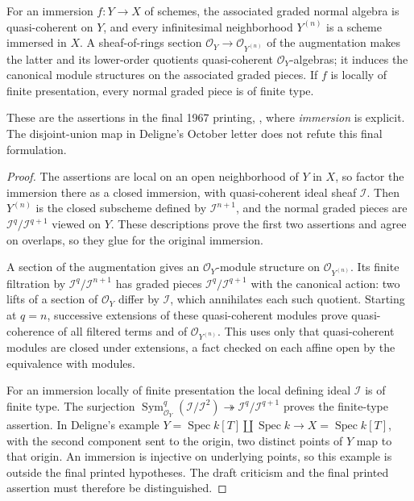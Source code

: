 \begin{proposition}\label{SA23-D-9}
For an immersion $f:Y\to X$ of schemes, the associated graded
normal algebra is quasi-coherent on $Y$, and every infinitesimal
neighborhood $Y^{(n)}$ is a scheme immersed in $X$.  A sheaf-of-rings
section $\mathcal O_Y\to\mathcal O_{Y^{(n)}}$ of the augmentation
makes the latter and its lower-order quotients quasi-coherent
$\mathcal O_Y$-algebras; it induces the canonical module structures
on the associated graded pieces.  If $f$ is locally of finite
presentation, every normal graded piece is of finite type.

These are the assertions in the final 1967 printing,
\cite[IV 16.1.5--16.1.6, pp.~6--7]{algEGAIV4}, where
\emph{immersion} is explicit.  The disjoint-union map in Deligne's
October letter does not refute this final formulation.
\end{proposition}
\begin{proof}
The assertions are local on an open neighborhood of $Y$ in $X$,
so factor the immersion there as a closed immersion, with
quasi-coherent ideal sheaf $\mathcal I$.  Then $Y^{(n)}$ is the
closed subscheme defined by $\mathcal I^{n+1}$, and the normal
graded pieces are $\mathcal I^q/\mathcal I^{q+1}$ viewed on $Y$.
These descriptions prove the first two assertions and agree on
overlaps, so they glue for the original immersion.

A section of the augmentation gives an $\mathcal O_Y$-module
structure on $\mathcal O_{Y^{(n)}}$.  Its finite filtration by
$\mathcal I^q/\mathcal I^{n+1}$ has graded pieces
$\mathcal I^q/\mathcal I^{q+1}$ with the canonical action:
two lifts of a section of $\mathcal O_Y$ differ by $\mathcal I$,
which annihilates each such quotient.  Starting at $q=n$,
successive extensions of these quasi-coherent modules prove
quasi-coherence of all filtered terms and of
$\mathcal O_{Y^{(n)}}$.  This uses only that quasi-coherent modules
are closed under extensions, a fact checked on each affine open by
the equivalence with modules.

For an immersion locally of finite presentation the local defining
ideal $\mathcal I$ is of finite type.  The surjection
$\operatorname{Sym}^q_{\mathcal O_Y}(\mathcal I/\mathcal I^2)
\twoheadrightarrow\mathcal I^q/\mathcal I^{q+1}$ proves the
finite-type assertion.  In Deligne's example
$Y=\operatorname{Spec}k[T]\amalg\operatorname{Spec}k\to
X=\operatorname{Spec}k[T]$, with the second component sent to the
origin, two distinct points of $Y$ map to that origin.  An immersion
is injective on underlying points, so this example is outside the
final printed hypotheses.  The draft criticism and the final
printed assertion must therefore be distinguished.
\end{proof}

